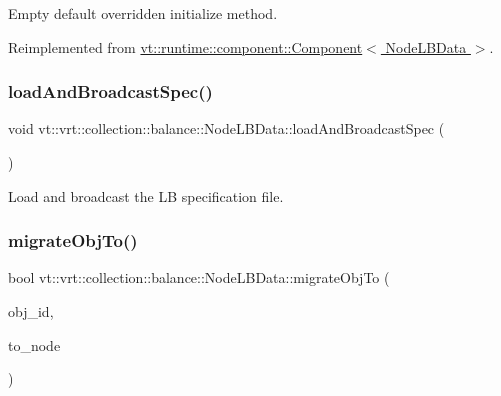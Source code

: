 Empty default overridden initialize method. 



Reimplemented from \hyperlink{structvt_1_1runtime_1_1component_1_1_component_a7f07384d294e59796add9ce6be2d6410}{vt\+::runtime\+::component\+::\+Component$<$ Node\+L\+B\+Data $>$}.

\mbox{\label{structvt_1_1vrt_1_1collection_1_1balance_1_1_node_l_b_data_ace5a540d8a81e8530ba38cb63580fbb9}} 
\subsubsection{\texorpdfstring{load\+And\+Broadcast\+Spec()}{loadAndBroadcastSpec()}}
{\footnotesize\ttfamily void vt\+::vrt\+::collection\+::balance\+::\+Node\+L\+B\+Data\+::load\+And\+Broadcast\+Spec (\begin{DoxyParamCaption}{ }\end{DoxyParamCaption})}



Load and broadcast the LB specification file. 

\mbox{\label{structvt_1_1vrt_1_1collection_1_1balance_1_1_node_l_b_data_a66619f696c49ce53d005f4b9ebbf12a2}} 
\subsubsection{\texorpdfstring{migrate\+Obj\+To()}{migrateObjTo()}}
{\footnotesize\ttfamily bool vt\+::vrt\+::collection\+::balance\+::\+Node\+L\+B\+Data\+::migrate\+Obj\+To (\begin{DoxyParamCaption}\item[{\hyperlink{namespacevt_1_1vrt_1_1collection_1_1balance_a9f5b53fafb270212279a4757d2c4cd28}{Element\+I\+D\+Struct}}]{obj\+\_\+id,  }\item[{\hyperlink{namespacevt_a866da9d0efc19c0a1ce79e9e492f47e2}{Node\+Type}}]{to\+\_\+node }\end{DoxyParamCaption})}



